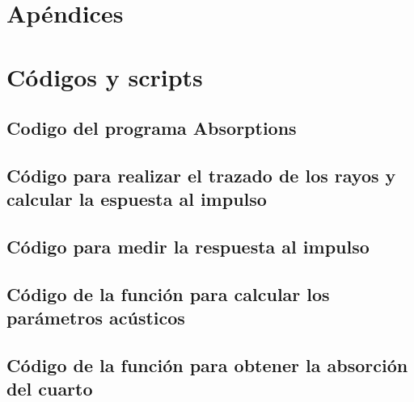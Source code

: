 \section*{Apéndices}
\appendix
\section{Códigos y scripts}


\subsection{Codigo del programa Absorptions}



\subsection{Código para realizar el trazado de los rayos y calcular la espuesta al impulso}


\subsection{Código para medir la respuesta al impulso}


\subsection{Código de la función para calcular los parámetros acústicos}


\subsection{Código de la función para obtener la absorción del cuarto}


